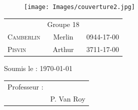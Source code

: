 \begin{titlepage}
\begin{sffamily}
\begin{center}
        \begin{figure}[h!]
        \centering
        \texttt{[image: Images/couverture2.jpg]}
        \end{figure}
    
\vfill
\large   
    
        \begin{table}[ht!]
\centering
\large
            \begin{tabular}{lcr}
                     & \Large{Groupe 18} & \\
                \LARGE{\textsc{Camberlin}} & \Large{Merlin} & \Large{0944-17-00} \\
                \LARGE{\textsc{Pisvin}} & \Large{Arthur} & \Large{3711-17-00} \\

            \end{tabular}
  
        \end{table}
\vspace{3cm}
    \begin{center}
        Soumis le : \today
    \end{center}
    
    
\vfill

\begin{tabular}{p{}p{}}
    \flushleft Professeur : \\
    & \flushright P. Van Roy\\
 
\end{tabular} 
    
\end{center}
\end{sffamily}
\end{titlepage}
